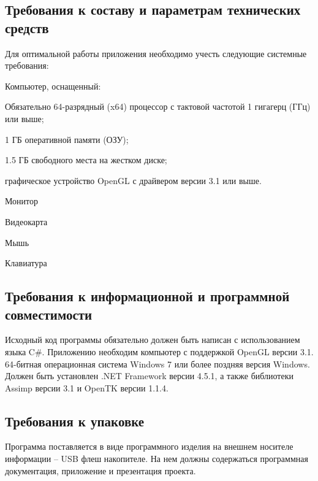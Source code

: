 \subsection{Требования к составу и параметрам технических средств}
Для оптимальной работы приложения необходимо учесть следующие системные требования:
\begin{my_enumerate}
\item Компьютер, оснащенный:
    \begin{my_enumerate}
    \item Обязательно 64-разрядный (x64) процессор с тактовой частотой 1 гигагерц (ГГц) или выше;
    \item 1 ГБ оперативной памяти (ОЗУ);
    \item 1.5 ГБ свободного места на жестком диске;
    \item графическое устройство OpenGL с драйвером версии 3.1 или выше.
    \end{my_enumerate}
\item Монитор
\item Видеокарта
\item Мышь
\item Клавиатура
\end{my_enumerate}


\subsection{Требования к информационной и программной совместимости}
Исходный код программы обязательно должен быть написан с использованием языка C\#. Приложению необходим компьютер с поддержкой OpenGL версии 3.1. 64-битная операционная система Windows 7 или более поздняя версия Windows. Должен быть установлен .NET Framework версии 4.5.1, а также библиотеки Assimp версии 3.1 и OpenTK версии 1.1.4.


\subsection{Требования к упаковке}
Программа поставляется в виде программного изделия на внешнем носителе информации – USB флеш накопителе. На нем должны содержаться программная документация, приложение и презентация проекта.
